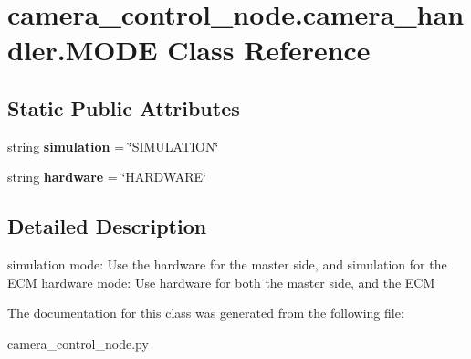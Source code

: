 \hypertarget{classcamera__control__node_1_1camera__handler_1_1MODE}{\section{camera\-\_\-control\-\_\-node.\-camera\-\_\-handler.\-M\-O\-D\-E Class Reference}
\label{classcamera__control__node_1_1camera__handler_1_1MODE}
}
\subsection*{Static Public Attributes}
\begin{DoxyCompactItemize}
\item 
\hypertarget{classcamera__control__node_1_1camera__handler_1_1MODE_a5fb11986f7bdf919c5ab2812f6b2a425}{string {\bfseries simulation} = \char`\"{}S\-I\-M\-U\-L\-A\-T\-I\-O\-N\char`\"{}}\label{classcamera__control__node_1_1camera__handler_1_1MODE_a5fb11986f7bdf919c5ab2812f6b2a425}

\item 
\hypertarget{classcamera__control__node_1_1camera__handler_1_1MODE_ae7040021f19a4011988151a40ee0d820}{string {\bfseries hardware} = \char`\"{}H\-A\-R\-D\-W\-A\-R\-E\char`\"{}}\label{classcamera__control__node_1_1camera__handler_1_1MODE_ae7040021f19a4011988151a40ee0d820}

\end{DoxyCompactItemize}


\subsection{Detailed Description}
\begin{DoxyVerb}    simulation mode: Use the hardware for the master side, 
            and simulation for the ECM
    hardware mode: Use hardware for both the master side,
            and the ECM
\end{DoxyVerb}
 

The documentation for this class was generated from the following file\-:\begin{DoxyCompactItemize}
\item 
camera\-\_\-control\-\_\-node.\-py\end{DoxyCompactItemize}
